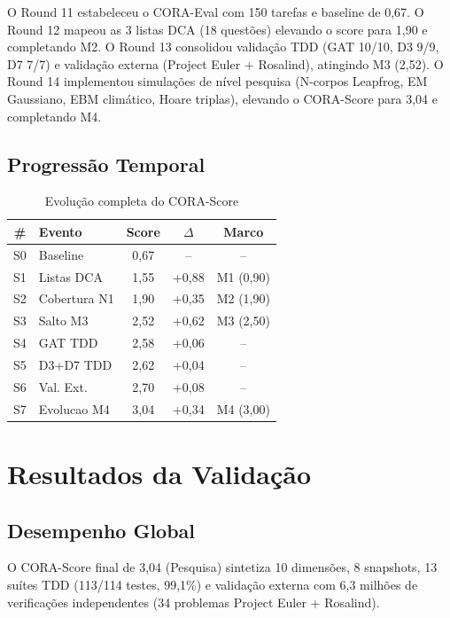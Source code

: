 \documentclass[12pt,a4paper,oneside]{article}
\begin{document}
O Round 11 estabeleceu o CORA-Eval com 150 tarefas e baseline de 0,67. O
Round 12 mapeou as 3 listas DCA (18 questões) elevando o score para 1,90
e completando M2. O Round 13 consolidou validação TDD (GAT 10/10, D3 9/9,
D7 7/7) e validação externa (Project Euler + Rosalind), atingindo M3 (2,52).
O Round 14 implementou simulações de nível pesquisa (N-corpos Leapfrog, EM
Gaussiano, EBM climático, Hoare triplas), elevando o CORA-Score para 3,04
e completando M4.

\subsection{Progressão Temporal}

\begin{table}[H]\centering\footnotesize
\caption{Evolução completa do CORA-Score}
\label{tab:evolucao}
\begin{tabular}{@{}clccc@{}}
\toprule
\textbf{\#} & \textbf{Evento} & \textbf{Score} & $\Delta$ & \textbf{Marco} \\
\midrule
S0 & Baseline & 0,67 & -- & -- \\
S1 & Listas DCA & 1,55 & +0,88 & M1 (0,90) \\
S2 & Cobertura N1 & 1,90 & +0,35 & M2 (1,90) \\
S3 & Salto M3 & 2,52 & +0,62 & M3 (2,50) \\
S4 & GAT TDD & 2,58 & +0,06 & -- \\
S5 & D3+D7 TDD & 2,62 & +0,04 & -- \\
S6 & Val. Ext. & 2,70 & +0,08 & -- \\
S7 & Evolucao M4 & 3,04 & +0,34 & M4 (3,00) \\
\bottomrule
\end{tabular}
\end{table}


\section{Resultados da Validação}

\subsection{Desempenho Global}

O CORA-Score final de 3,04 (Pesquisa) sintetiza 10 dimensões, 8 snapshots,
13 suítes TDD (113/114 testes, 99,1\%) e validação externa com 6,3 milhões
de verificações independentes (34 problemas Project Euler + Rosalind).
\end{document}
